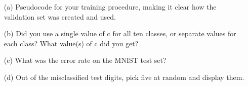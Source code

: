 \documentclass{article}
\begin{document}
\begin{itemize}
    \begin{enumerate}
        \item[(a)] Pseudocode for your training procedure, making it clear how the validation set was created and used.
        \item[(b)] Did you use a single value of c for all ten classes, or separate values for each class?
        What value(s) of c did you get?
        \item[(c)] What was the error rate on the MNIST test set?
        \item[(d)] Out of the misclassified test digits, pick five at random and display them.
    \end{enumerate}
\end{itemize}
\end{document}
